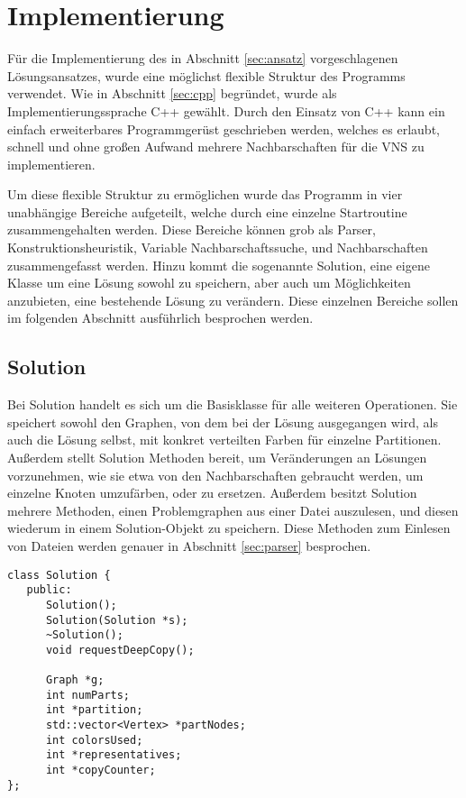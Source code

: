 \chapter{Implementierung}
Für die Implementierung des in Abschnitt \ref{sec:ansatz} vorgeschlagenen Lösungsansatzes, wurde eine möglichst flexible Struktur des Programms verwendet. Wie in Abschnitt \ref{sec:cpp} begründet, wurde
als Implementierungssprache C++ gewählt. Durch den Einsatz von C++ kann ein einfach erweiterbares Programmgerüst geschrieben werden, welches es erlaubt, schnell und ohne großen Aufwand mehrere Nachbarschaften
für die VNS zu implementieren. 

Um diese flexible Struktur zu ermöglichen wurde das Programm in vier unabhängige Bereiche aufgeteilt, welche durch eine einzelne Startroutine zusammengehalten werden. Diese Bereiche können grob als Parser, 
Konstruktionsheuristik, Variable Nachbarschaftssuche, und Nachbarschaften zusammengefasst werden. Hinzu kommt die sogenannte Solution, eine eigene Klasse um eine Lösung sowohl zu speichern, aber auch um Möglichkeiten
anzubieten, eine bestehende Lösung zu verändern. Diese einzelnen Bereiche sollen im folgenden Abschnitt ausführlich besprochen werden.

\section{Solution}
Bei Solution handelt es sich um die Basisklasse für alle weiteren Operationen. Sie speichert sowohl den Graphen, von dem bei der Lösung ausgegangen wird, als auch die Lösung selbst, mit konkret verteilten Farben
für einzelne Partitionen. Außerdem stellt Solution Methoden bereit, um Veränderungen an Lösungen vorzunehmen, wie sie etwa von den Nachbarschaften gebraucht werden, um einzelne Knoten umzufärben, oder zu ersetzen.
Außerdem besitzt Solution mehrere Methoden, einen Problemgraphen aus einer Datei auszulesen, und diesen wiederum in einem Solution-Objekt zu speichern. Diese Methoden zum Einlesen von Dateien werden genauer 
in Abschnitt \ref{sec:parser} besprochen.

\singlespacing
\begin{lstlisting}[caption={Ein Ausschnitt aus der Signatur der Solutionklasse},label=lst:solution]
class Solution {
   public:
      Solution();
      Solution(Solution *s);
      ~Solution(); 
      void requestDeepCopy();

      Graph *g;
      int numParts;
      int *partition;
      std::vector<Vertex> *partNodes;
      int colorsUsed;
      int *representatives;
      int *copyCounter;
};
\end{lstlisting}


